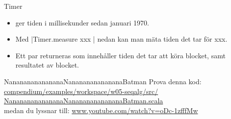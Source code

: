 \ifkompendium\else
\begin{SlideExtra}{Timer}\SlideFontSmall
\setlength{\leftmargini}{0pt}
\begin{itemize}
\item \href{https://docs.oracle.com/javase/8/docs/api/java/lang/System.html#currentTimeMillis--}{} ger tiden i millisekunder sedan januari 1970.

\item Med \code|Timer.measure{ xxx }| nedan kan man mäta tiden det tar för xxx.

\item Ett par  returneras som innehåller tiden det tar att köra blocket, samt resultatet av blocket.
\end{itemize}
\vspace{0em}
\end{SlideExtra}


\begin{SlideExtra}{NanananananananaNanananananananaBatman}\SlideFontTiny
Prova denna kod:
\href{https://github.com/lunduniversity/introprog/blob/master/compendium/examples/workspace/w05-seqalg/src/NanananananananaNanananananananaBatman.scala}{compendium/examples/workspace/w05-seqalg/src/\\NanananananananaNanananananananaBatman.scala} \\

medan du lyssnar till: \href{https://www.youtube.com/watch?v=oDc-1zfffMw}{www.youtube.com/watch?v=oDc-1zfffMw}

\vspace{-0.7em}
\end{SlideExtra}
\fi



